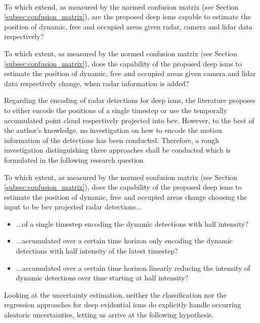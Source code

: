\\
\begin{requ} \label{requ:comparison_of_isms}
	To which extend, as measured by the normed confusion matrix (see Section \ref{subsec:confusion_matrix}), are the proposed deep \gls{ism}s capable to estimate the position of dynamic, free and occupied areas given radar, camera and lidar data respectively?
\end{requ}
\begin{requ} \label{requ:comparison_of_isms_fusion}
	To which extent, as measured by the normed confusion matrix (see Section \ref{subsec:confusion_matrix}), does the capability of the proposed deep \gls{ism}s to estimate the position of dynamic, free and occupied areas given camera and lidar data respectively change, when radar information is added? 
\end{requ}
Regarding the encoding of radar detections for deep \gls{ism}s, the literature proposes to either encode the positions of a single timestep or use the temporally accumulated point cloud respectively projected into \gls{bev}. However, to the best of the author's knowledge, no investigation on how to encode the motion information of the detections has been conducted. Therefore, a rough investigation distinguishing three approaches shall be conducted which is formulated in the following research question\\
\begin{requ} \label{requ:radar_dyn_encoding}
	To which extent, as measured by the normed confusion matrix (see Section \ref{subsec:confusion_matrix}), does the capability of the proposed deep \gls{ism}s to estimate the position of dynamic, free and occupied areas change choosing the input to be \gls{bev} projected radar detections...
	\begin{itemize}[noitemsep,nolistsep]
		\item ...of a single timestep encoding the dynamic detections with half intensity?
		\item ...accumulated over a certain time horizon only encoding the dynamic detections with half intensity of the latest timestep?
		\item ...accumulated over a certain time horizon linearly reducing the intensity of dynamic detections over time starting at half intensity?
	\end{itemize} 
\end{requ}
Looking at the uncertainty estimation, neither the classification nor the regression approaches for deep evidential \gls{ism}s do explicitly handle occurring aleatoric uncertainties, letting us arrive at the following hypothesis.
